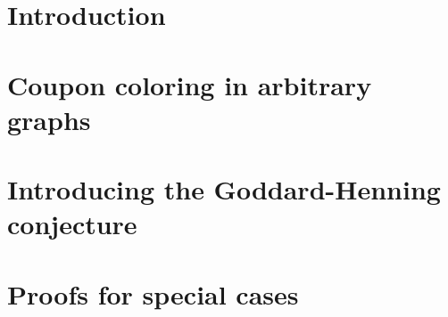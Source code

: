 \documentclass[12pt]{report}
\begin{document}


\newpage\null\thispagestyle{empty}\newpage

\tableofcontents

\chapter*{Introduction}


\chapter{Coupon coloring in arbitrary graphs}


\chapter{Introducing the Goddard-Henning conjecture}


\chapter{Proofs for special cases}

\end{document}
